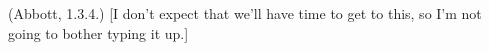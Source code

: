 \documentclass[12pt]{article}
\theoremstyle{definition}
\begin{document}
\begin{Exercise}
    (Abbott, 1.3.4.) [I don't expect that we'll have time to get to this, so
    I'm not going to bother typing it up.]
\end{Exercise}




\end{document}

